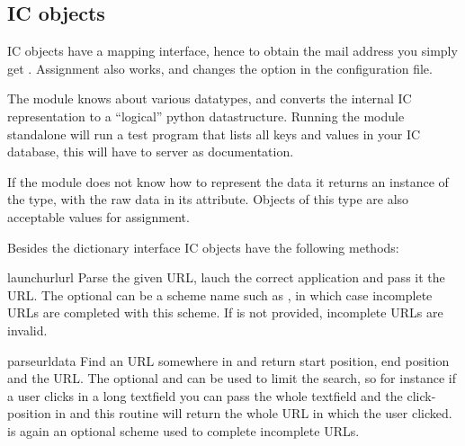 \subsection{IC objects}

IC objects have a mapping interface, hence to obtain the mail address
you simply get . Assignment also works,
and changes the option in the configuration file.

The module knows about various datatypes, and converts the internal IC
representation to a ``logical'' python datastructure. Running the
 module standalone will run a test program that lists all
keys and values in your IC database, this will have to server as
documentation.

If the module does not know how to represent the data it returns an
instance of the  type, with the raw data in its
 attribute. Objects of this type are also acceptable values
for assignment.

Besides the dictionary interface IC objects have the following methods:


\begin{funcdesc}{launchurl}{url}
Parse the given URL, lauch the correct application and pass it the
URL. The optional  can be a scheme name such as
, in which case incomplete URLs are completed with this
scheme.  If  is not provided, incomplete URLs are invalid.
\end{funcdesc}

\begin{funcdesc}{parseurl}{data}
Find an URL somewhere in  and return start position, end
position and the URL. The optional  and  can be
used to limit the search, so for instance if a user clicks in a long
textfield you can pass the whole textfield and the click-position in
 and this routine will return the whole URL in which the
user clicked.   is again an optional scheme used to complete
incomplete URLs.
\end{funcdesc}

